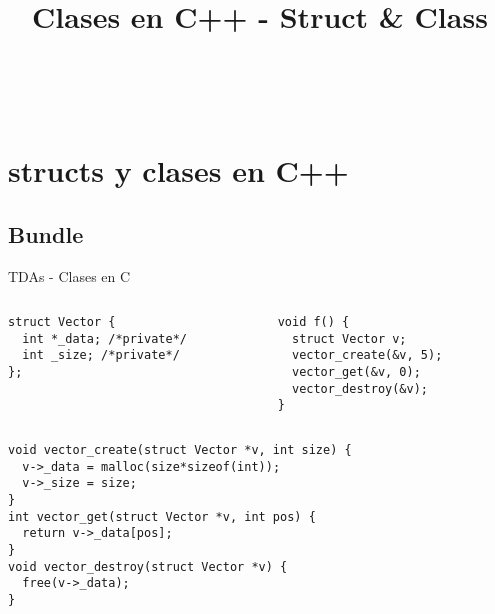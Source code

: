 


\title%
{Clases en C++ - Struct \& Class}

\subject{Clases en C++ - Struct \& Class}



\begin{frame}
   \titlepage
\end{frame}

~%
\section{structs y clases en C++}
\subsection{Bundle}
\begin{frame}{TDAs - Clases en C}{}
   \begin{columns}[t]
      \begin{column}{.4\linewidth}
         \begin{lstlisting}[style=normal,firstnumber=1]
struct Vector {
  int *_data; /*private*/
  int _size; /*private*/
};


         \end{lstlisting}
      \end{column}
      \begin{column}{.4\linewidth}
         \begin{lstlisting}[style=normal,firstnumber=15]
void f() {
  struct Vector v;
  vector_create(&v, 5);
  vector_get(&v, 0);
  vector_destroy(&v);
}
         \end{lstlisting}
      \end{column}
   \end{columns}

   \begin{columns}[t]
      \begin{column}{.4\linewidth}
        \begin{lstlisting}[style=normal,firstnumber=5]
void vector_create(struct Vector *v, int size) {
  v->_data = malloc(size*sizeof(int));
  v->_size = size;
}
int vector_get(struct Vector *v, int pos) {
  return v->_data[pos];
}
void vector_destroy(struct Vector *v) {
  free(v->_data);
}

        \end{lstlisting}
      \end{column}
      \begin{column}{.4\linewidth}
      \end{column}
   \end{columns}
\end{frame}
